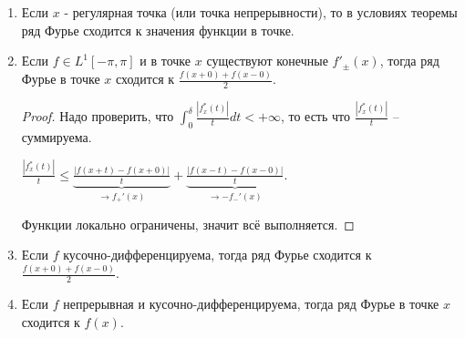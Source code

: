 \begin{consequence}
    \begin{enumerate}
        \item {
            Если $x$ - регулярная точка (или точка непрерывности), то в условиях теоремы ряд Фурье сходится к значения функции в точке.
        }
        \item {

            Если $f \in L^1[-\pi, \pi]$ и в точке $x$ существуют конечные $f'_{\pm} (x)$, тогда ряд Фурье в точке $x$ сходится к $\frac{f(x + 0) + f(x - 0)}{2}$.

            \begin{proof}
                Надо проверить, что $\int_{0}^{\delta} \frac{|f_x^*(t)|}{t} dt < +\infty$, то есть что $\frac{|f_x^*(t)|}{t}$ -- суммируема.

                $\frac{|f_x^* (t)|}{t} \leqslant \underbrace{\frac{|f(x + t) - f(x + 0)|}{t}}_{\rightarrow f_+'(x)} + \underbrace{\frac{|f(x - t) - f(x - 0)|}{t}}_{\rightarrow -f_-' (x)}$.
                
                Функции локально ограничены, значит всё выполняется.
            \end{proof}
        }
        \item {


            Если $f$ кусочно-дифференцируема, тогда ряд Фурье сходится к $\frac{f(x+0) + f(x-0)}{2}$.
        }
        \item {

            Если $f$ непрерывная и кусочно-дифференцируема, тогда ряд Фурье в точке $x$ сходится к $f(x)$.
        }
    \end{enumerate}
\end{consequence}

